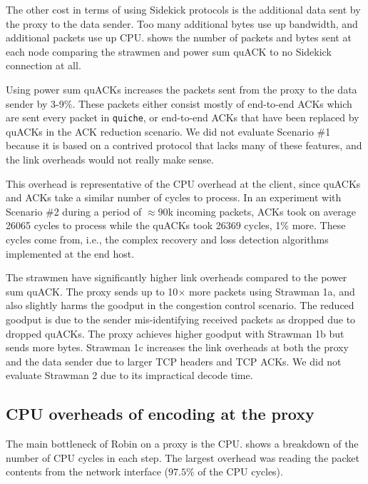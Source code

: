 The other cost in terms of using Sidekick protocols is the additional data
sent by the proxy to the data sender.
Too many additional bytes use up bandwidth, and additional packets use
up CPU\@.
 shows the number of packets and bytes sent at each
node comparing the strawmen and power sum quACK to no Sidekick connection at all.

Using power sum quACKs increases the packets sent from the proxy to the data
sender
by 3-9\%. These packets either consist mostly
of end-to-end ACKs which are sent every packet in \texttt{quiche}, or end-to-end
ACKs that have been replaced by quACKs in the ACK reduction scenario.
We did not evaluate Scenario \#1 because it is based
on a contrived protocol that lacks many of these features, and the link
overheads would not really make sense.

This overhead is representative of the CPU overhead at the client, since
quACKs and ACKs take a similar number of cycles to process. In an experiment
with Scenario \#2 during a period of $\approx90$k incoming packets, ACKs took on
average 26065 cycles to process while the quACKs took 26369 cycles, 1\% more.
These cycles come from, i.e., the complex recovery and loss detection algorithms
implemented at the end host.

The strawmen have significantly higher link overheads compared to the power sum
quACK\@. The proxy sends up to 10$\times$ more packets using Strawman 1a, and
also slightly harms the goodput in the congestion control scenario.
The reduced goodput is due to the sender mis-identifying received packets as
dropped due to dropped quACKs.
The proxy achieves higher goodput with Strawman 1b but sends
more bytes. Strawman 1c increases the link overheads at both the proxy and the
data sender due to larger TCP headers and TCP ACKs.
We did not evaluate Strawman 2 due to its impractical decode time.

\subsection{CPU overheads of encoding at the proxy}
\label{sec:sidekick:evaluation:cpu-overheads}



The main bottleneck of Robin on a proxy is the CPU\@.
 shows a breakdown of the number of CPU cycles in each
step. The largest overhead was reading the packet contents from the network
interface ($97.5\%$ of the CPU cycles).

